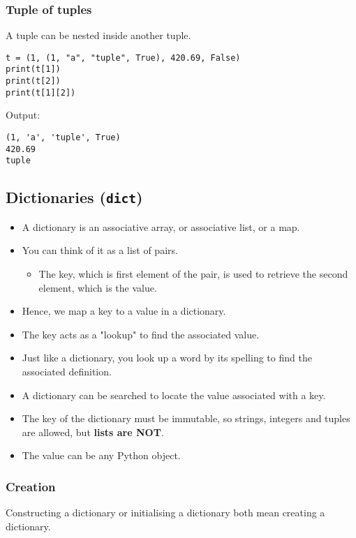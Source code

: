 \documentclass[11pt]{article}
\begin{document}
\subsubsection{Tuple of tuples}
\label{sec:org3bb171d}
A tuple can be nested inside another tuple.
\begin{verbatim}
t = (1, (1, "a", "tuple", True), 420.69, False)
print(t[1])
print(t[2])
print(t[1][2])
\end{verbatim}

 \noindent Output:

\label{org4e112e1}
\begin{verbatim}
(1, 'a', 'tuple', True)
420.69
tuple
\end{verbatim}


 \newpage
\subsection{Dictionaries (\texttt{dict})}
\label{sec:orgd05a3eb}
\begin{itemize}
\item A dictionary is an associative array, or associative list, or a map.
\item You can think of it as a list of pairs.
\begin{itemize}
\item The key, which is first element of the pair, is used to retrieve the second element, which is the value.
\end{itemize}
\item Hence, we map a key to a value in a dictionary.
\item The key acts as a "lookup" to find the associated value.
\item Just like a dictionary, you look up a word by its spelling to find the associated definition.
\item A dictionary can be searched to locate the value associated with a key.
\item The key of the dictionary must be immutable, so strings, integers and tuples are allowed, but \textbf{lists are NOT}.
\item The value can be any Python object.
\end{itemize}
\subsubsection{Creation}
\label{sec:orgb6e89f1}
Constructing a dictionary or initialising a dictionary both mean creating a dictionary.
\end{document}
